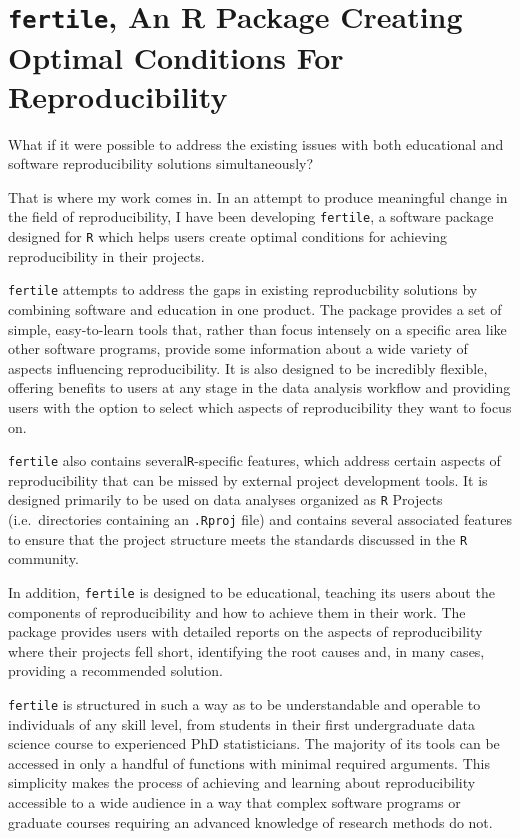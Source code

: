 \documentclass[12pt,twoside]{reedthesis}
\begin{document}
\section{\texorpdfstring{\texttt{fertile}, An R Package Creating Optimal
Conditions For
Reproducibility}{fertile, An R Package Creating Optimal Conditions For Reproducibility}}\label{fertile-an-r-package-creating-optimal-conditions-for-reproducibility}

What if it were possible to address the existing issues with both
educational and software reproducibility solutions simultaneously?

That is where my work comes in. In an attempt to produce meaningful
change in the field of reproducibility, I have been developing
\texttt{fertile}, a software package designed for \texttt{R} which helps
users create optimal conditions for achieving reproducibility in their
projects.

\texttt{fertile} attempts to address the gaps in existing reproducbility
solutions by combining software and education in one product. The
package provides a set of simple, easy-to-learn tools that, rather than
focus intensely on a specific area like other software programs, provide
some information about a wide variety of aspects influencing
reproducibility. It is also designed to be incredibly flexible, offering
benefits to users at any stage in the data analysis workflow and
providing users with the option to select which aspects of
reproducibility they want to focus on.

\texttt{fertile} also contains several\texttt{R}-specific features,
which address certain aspects of reproducibility that can be missed by
external project development tools. It is designed primarily to be used
on data analyses organized as \texttt{R} Projects (i.e.~directories
containing an \texttt{.Rproj} file) and contains several associated
features to ensure that the project structure meets the standards
discussed in the \texttt{R} community.

In addition, \texttt{fertile} is designed to be educational, teaching
its users about the components of reproducibility and how to achieve
them in their work. The package provides users with detailed reports on
the aspects of reproducibility where their projects fell short,
identifying the root causes and, in many cases, providing a recommended
solution.

\texttt{fertile} is structured in such a way as to be understandable and
operable to individuals of any skill level, from students in their first
undergraduate data science course to experienced PhD statisticians. The
majority of its tools can be accessed in only a handful of functions
with minimal required arguments. This simplicity makes the process of
achieving and learning about reproducibility accessible to a wide
audience in a way that complex software programs or graduate courses
requiring an advanced knowledge of research methods do not.
\end{document}
